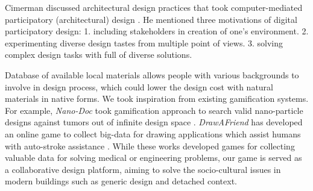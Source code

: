 Cimerman discussed architectural design practices that took computer-mediated participatory (architectural) design \cite{cimerman2000participatory}.
He mentioned three motivations of digital participatory design:
1. including stakeholders in creation of one's environment.
2. experimenting diverse design tastes from multiple point of views.
3. solving complex design tasks with full of diverse solutions.

Database of available local materials allows people with various backgrounds to involve in design process, which could lower the design cost with natural materials in native forms.
We took inspiration from existing gamification systems.
For example, \textit{Nano-Doc} took gamification approach to search valid nano-particle designs against tumors out of infinite design space \cite{hauertcrowdsourcing}.
\textit{DrawAFriend} has developed an online game to collect big-data for drawing applications which assist humans with auto-stroke assistance \cite{limpaecher2013real}.
While these works developed games for collecting valuable data for solving medical or engineering problems, our game is served as a collaborative design platform, aiming to solve the socio-cultural issues in modern buildings such as generic design and detached context.
